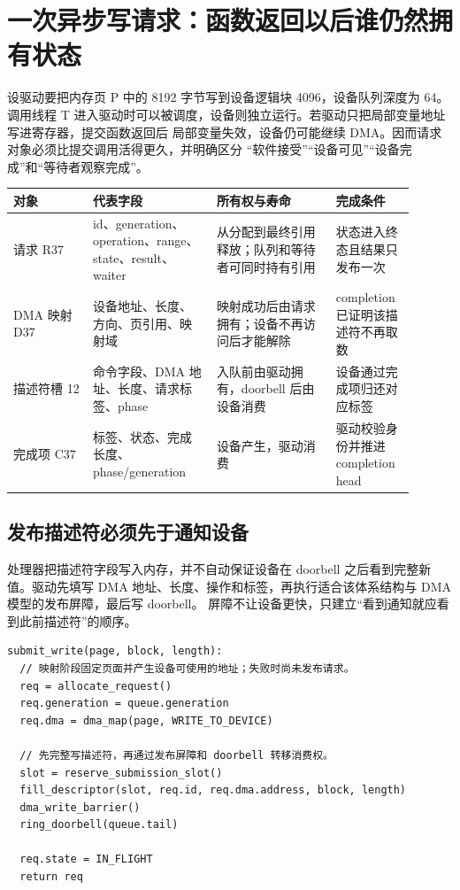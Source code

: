 \section{一次异步写请求：函数返回以后谁仍然拥有状态}

设驱动要把内存页 P 中的 8192 字节写到设备逻辑块 4096，设备队列深度为 64。调用线程 T
进入驱动时可以被调度，设备则独立运行。若驱动只把局部变量地址写进寄存器，提交函数返回后
局部变量失效，设备仍可能继续 DMA。因而请求对象必须比提交调用活得更久，并明确区分
“软件接受”“设备可见”“设备完成”和“等待者观察完成”。

\begin{longtable}{|L{0.18\linewidth}|L{0.28\linewidth}|L{0.27\linewidth}|L{0.17\linewidth}|}
\hline
对象 & 代表字段 & 所有权与寿命 & 完成条件 \\ \hline
请求 R37 & id、generation、operation、range、state、result、waiter &
从分配到最终引用释放；队列和等待者可同时持有引用 & 状态进入终态且结果只发布一次 \\\tablerowrule
DMA 映射 D37 & 设备地址、长度、方向、页引用、映射域 &
映射成功后由请求拥有；设备不再访问后才能解除 & completion 已证明该描述符不再取数 \\\tablerowrule
描述符槽 12 & 命令字段、DMA 地址、长度、请求标签、phase &
入队前由驱动拥有，doorbell 后由设备消费 & 设备通过完成项归还对应标签 \\\tablerowrule
完成项 C37 & 标签、状态、完成长度、phase/generation &
设备产生，驱动消费 & 驱动校验身份并推进 completion head \\ \hline
\end{longtable}

\subsection{发布描述符必须先于通知设备}

处理器把描述符字段写入内存，并不自动保证设备在 doorbell 之后看到完整新值。驱动先填写
DMA 地址、长度、操作和标签，再执行适合该体系结构与 DMA 模型的发布屏障，最后写 doorbell。
屏障不让设备更快，只建立“看到通知就应看到此前描述符”的顺序。

\begin{lstlisting}
submit_write(page, block, length):
  // 映射阶段固定页面并产生设备可使用的地址；失败时尚未发布请求。
  req = allocate_request()
  req.generation = queue.generation
  req.dma = dma_map(page, WRITE_TO_DEVICE)

  // 先完整写描述符，再通过发布屏障和 doorbell 转移消费权。
  slot = reserve_submission_slot()
  fill_descriptor(slot, req.id, req.dma.address, block, length)
  dma_write_barrier()
  ring_doorbell(queue.tail)

  req.state = IN_FLIGHT
  return req
\end{lstlisting}

